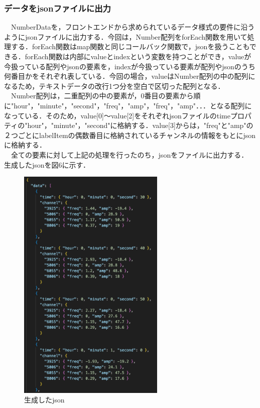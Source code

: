  \subsubsection{データをjsonファイルに出力}
　NumberDataを，フロントエンドから求められているデータ様式の要件に沿うようにjsonファイルに出力する．今回は，Number配列をforEach関数を用いて処理する．forEach関数はmap関数と同じコールバック関数で，jsonを扱うこともできる．forEach関数は内部にvalueとindexという変数を持つことができ，valueが今扱っている配列やjsonの要素を，indexが今扱っている要素が配列やjsonのうち何番目かをそれぞれ表している．今回の場合，valueはNumber配列の中の配列になるため，テキストデータの改行1つ分を空白で区切った配列となる．
　Number配列は，二重配列の中の要素が，0番目の要素から順に"hour"，"minute"，"second"，"freq"，"amp"，"freq"，"amp"．．．となる配列になっている．そのため，value[0]〜value[2]をそれぞれjsonファイルのtimeプロパティの"hour"，"minute"，"second"に格納する．value[3]からは，"freq"と"amp"の２つごとにlabelItemの偶数番目に格納されているチャンネルの情報をもとにjsonに格納する．\\
　全ての要素に対して上記の処理を行ったのち，jsonをファイルに出力する．\\
生成したjsonを図6に示す．\\
\begin{figure}[h]
  \centering
  \caption{生成したjson}
  \includegraphics[width=70mm]{fig/jsonData.png}
\end{figure}

